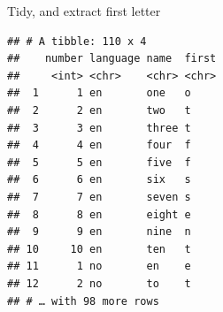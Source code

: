 \documentclass[ignorenonframetext,]{beamer}
\newenvironment{Shaded}{\begin{snugshade}}{\end{snugshade}}
\newcommand{\DataTypeTok}[1]{\textcolor[rgb]{0.13,0.29,0.53}{#1}}
\newcommand{\DecValTok}[1]{\textcolor[rgb]{0.00,0.00,0.81}{#1}}
\newcommand{\KeywordTok}[1]{\textcolor[rgb]{0.13,0.29,0.53}{\textbf{#1}}}
\newcommand{\NormalTok}[1]{#1}
\newcommand{\OperatorTok}[1]{\textcolor[rgb]{0.81,0.36,0.00}{\textbf{#1}}}
\newcommand{\StringTok}[1]{\textcolor[rgb]{0.31,0.60,0.02}{#1}}
\begin{document}
\begin{frame}[fragile]{Tidy, and extract first letter}
\protect\hypertarget{tidy-and-extract-first-letter}{}

\begin{Shaded}
\end{Shaded}

\begin{verbatim}
## # A tibble: 110 x 4
##    number language name  first
##     <int> <chr>    <chr> <chr>
##  1      1 en       one   o    
##  2      2 en       two   t    
##  3      3 en       three t    
##  4      4 en       four  f    
##  5      5 en       five  f    
##  6      6 en       six   s    
##  7      7 en       seven s    
##  8      8 en       eight e    
##  9      9 en       nine  n    
## 10     10 en       ten   t    
## 11      1 no       en    e    
## 12      2 no       to    t    
## # … with 98 more rows
\end{verbatim}

\end{frame}
\end{document}
